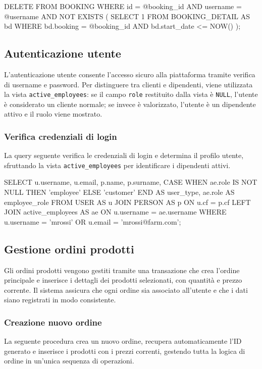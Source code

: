 \documentclass[a4paper,12pt]{report}
\begin{document}
\begin{sqlcode}[caption={}]
DELETE FROM BOOKING
WHERE
  id = @booking_id
  AND username = @username
  AND NOT EXISTS (
    SELECT 1
  FROM BOOKING_DETAIL AS bd
    WHERE
      bd.booking = @booking_id
      AND bd.start_date <= NOW()
  );
\end{sqlcode}

\newpage
\subsection{Autenticazione utente}
L'autenticazione utente consente l'accesso sicuro alla piattaforma
tramite verifica di username e password. Per distinguere tra clienti
e dipendenti, viene utilizzata la vista \texttt{active\_employees}:
se il campo \texttt{role} restituito dalla vista è \texttt{NULL},
l'utente è considerato un cliente normale; se invece è valorizzato,
l'utente è un dipendente attivo e il ruolo viene mostrato.

\subsubsection{Verifica credenziali di login}
La query seguente verifica le credenziali di login e determina il
profilo utente, sfruttando la vista \texttt{active\_employees} per
identificare i dipendenti attivi.

\begin{sqlcode}[caption={}]
SELECT
  u.username,
  u.email,
  p.name,
  p.surname,
  CASE WHEN ae.role IS NOT NULL THEN 'employee' ELSE 'customer' END AS user_type,
  ae.role AS employee_role
FROM USER AS u
JOIN PERSON AS p ON u.cf = p.cf
LEFT JOIN active_employees AS ae ON u.username = ae.username
WHERE u.username = 'mrossi' OR u.email = 'mrossi@farm.com';
\end{sqlcode}

\newpage
\subsection{Gestione ordini prodotti}
Gli ordini prodotti vengono gestiti tramite una transazione che crea
l'ordine principale e inserisce i dettagli dei prodotti selezionati,
con quantità e prezzo corrente. Il sistema assicura che ogni ordine
sia associato all'utente e che i dati siano registrati in modo consistente.

\subsubsection{Creazione nuovo ordine}
La seguente procedura crea un nuovo ordine, recupera automaticamente
l'ID generato e inserisce i prodotti con i prezzi correnti, gestendo
tutta la logica di ordine in un'unica sequenza di operazioni.
\end{document}
